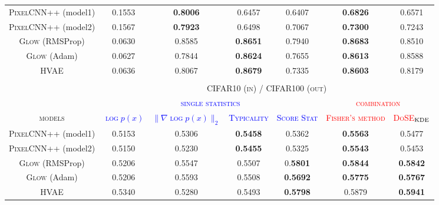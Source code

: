 {\begin{table}[tb]
{\begin{tabular}{ccccccc}
            \midrule
            \textsc{PixelCNN++} (model1)  & 0.1553 & \textbf{0.8006} &  0.6457 & 0.6407 & \textbf{0.6826} & 0.6571 \\
            \textsc{PixelCNN++} (model2) & 0.1567 & \textbf{0.7923} & 0.6498 &  0.7067 & \textbf{0.7300} & 0.7243 \\
            \textsc{Glow} (RMSProp)  &  0.0630 & 0.8585 & \textbf{0.8651} &  0.7940 &  \textbf{0.8683} & 0.8510 \\
            \textsc{Glow} (Adam)   &  0.0627 & 0.7844 &  \textbf{0.8624} &  0.7655 &  \textbf{0.8613} &  0.8588 \\
            \textsc{HVAE}  & 0.0636 & 0.8067  & \textbf{0.8679} & 0.7335 & \textbf{0.8603} & 0.8179 \\
            \bottomrule
            & & & & & & \\
            \toprule
            &\multicolumn{6}{c}{\textsc{CIFAR10 (in) / CIFAR100 (out)}}\\
            \cmidrule{2-7}
            & \multicolumn{4}{c}{\textcolor{blue}{\textsc{single statistics}}} & \multicolumn{2}{c}{\textcolor{red}{\textsc{combination}}}\\
            \cmidrule(r){2-5}\cmidrule(l){6-7}
            \textsc{models}  & \textcolor{blue}{\textsc{$\log p(x)$}} & \textcolor{blue}{\textsc{$\|\nabla \log p(x)\|_2$}} & \textcolor{blue}{\textsc{Typicality}} & \textcolor{blue}{\textsc{Score Stat}} & \textcolor{red}{\textsc{Fisher's method}} & \textcolor{red}{\textsc{DoSE$_{\textup{KDE}}$}} \\
            \midrule
            \textsc{PixelCNN++} (model1)  & 0.5153 & 0.5306 & \textbf{0.5458} & 0.5362 & \textbf{0.5563}  & 0.5477\\
            \textsc{PixelCNN++} (model2) & 0.5150 &  0.5230 & \textbf{0.5455} & 0.5325  & \textbf{0.5543} & 0.5453 \\
            \textsc{Glow} (RMSProp)  &  0.5206 & 0.5547 & 0.5507 & 0.\textbf{5801} & \textbf{0.5844} &  \textbf{0.5842} \\
            \textsc{Glow} (Adam)   & 0.5206 & 0.5593 & 0.5508  & \textbf{0.5692} & \textbf{0.5775} &  \textbf{0.5767} \\
            \textsc{HVAE}  & 0.5340 & 0.5280 &  0.5493 &  \textbf{0.5798} &  0.5879 &  \textbf{0.5941}\\
            \bottomrule 
        \end{tabular}
        \label{tab_modelagnostic:single_sample_results}
    }
    \vspace*{-\baselineskip}
\end{table}





}
